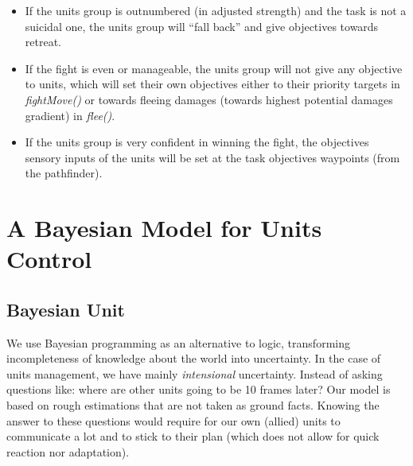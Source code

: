 \begin{itemize}
\begin{itemize}
    \item If the units group is outnumbered (in adjusted strength) and the task is not a suicidal one, the units group will ``fall back'' and give objectives towards retreat. 
    \item If the fight is even or manageable, the units group will not give any objective to units, which will set their own objectives either to their priority targets in \textit{fightMove()} or towards fleeing damages (towards highest potential damages gradient) in \textit{flee()}.
    \item If the units group is very confident in winning the fight, the objectives sensory inputs of the units will be set at the task objectives waypoints (from the pathfinder).
\end{itemize}
\end{itemize} 

\section{A Bayesian Model for Units Control}

\label{sec:bayesianunit}
\subsection{Bayesian Unit}

We use Bayesian programming as an alternative to logic, transforming incompleteness of knowledge about the world into uncertainty. In the case of units management, we have mainly \textit{intensional} uncertainty. Instead of asking questions like: where are other units going to be 10 frames later? Our model is based on rough estimations that are not taken as ground facts. Knowing the answer to these questions would require for our own (allied) units to communicate a lot and to stick to their plan (which does not allow for quick reaction nor adaptation). 


